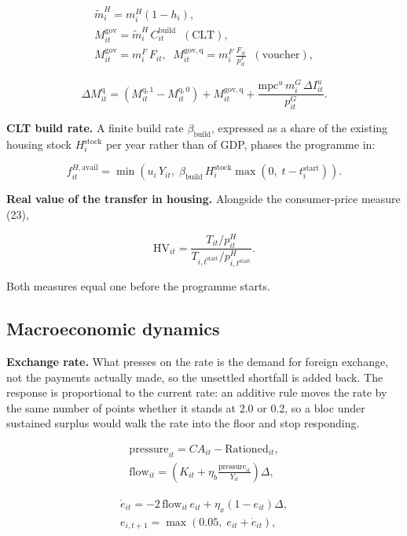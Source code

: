 \documentclass[preprint,review,12pt]{elsarticle}
\begin{document}
\[\begin{gathered} \tilde{m}^H_i = m^H_i (1 - h_i), \\ M^{\mathrm{gov}}_{it} = \tilde{m}^H_i \, C^{\mathrm{build}}_{it} \;\; (\text{CLT}), \\ M^{\mathrm{gov}}_{it} = m^F_i \, F_{it}, \;\; M^{\mathrm{gov,q}}_{it} = m^F_i \, \frac{F_{it}}{p^F_{it}} \;\; (\text{voucher}), \end{gathered}\]

\[\Delta M^{\mathrm{q}}_{it} = \left( M^{\mathrm{q},1}_{it} - M^{\mathrm{q},0}_{it} \right) + M^{\mathrm{gov,q}}_{it} + \frac{\mathrm{mpc}^u \, m^G_i \, \Delta I^u_{it}}{p^G_{it}}. \tag{B.3}\]

\textbf{CLT build rate.} A finite build rate \(\beta_{\mathrm{build}}\),
expressed as a share of the existing housing stock
\(H^{\mathrm{stock}}_i\) per year rather than of GDP, phases the
programme in:

\[f^{H,\mathrm{avail}}_{it} = \min\left( u_i \, Y_{it},\; \beta_{\mathrm{build}} \, H^{\mathrm{stock}}_i \max\left(0,\; t - t^{\mathrm{start}}_i \right) \right). \tag{B.4}\]

\textbf{Real value of the transfer in housing.} Alongside the
consumer-price measure (23),

\[\mathrm{HV}_{it} = \frac{T_{it} / p^H_{it}}{T_{i,t^{\mathrm{start}}} / p^H_{i,t^{\mathrm{start}}}}. \tag{B.5}\]

Both measures equal one before the programme starts.

\subsection{Macroeconomic dynamics}

\textbf{Exchange rate.} What presses on the rate is the demand for
foreign exchange, not the payments actually made, so the unsettled
shortfall is added back. The response is proportional to the current
rate: an additive rule moves the rate by the same number of points
whether it stands at 2.0 or 0.2, so a bloc under sustained surplus would
walk the rate into the floor and stop responding.

\[\begin{gathered} \mathrm{pressure}_{it} = CA_{it} - \mathrm{Rationed}_{it}, \\ \mathrm{flow}_{it} = \left( K_{it} + \eta_b \frac{\mathrm{pressure}_{it}}{Y_{it}} \right) \Delta, \end{gathered}\]

\[\begin{gathered} \dot{e}_{it} = -2 \, \mathrm{flow}_{it} \, e_{it} + \eta_x \left( 1 - e_{it} \right) \Delta, \\ e_{i,t+1} = \max\left( 0.05,\; e_{it} + \dot{e}_{it} \right), \end{gathered} \tag{B.6}\]
\end{document}
